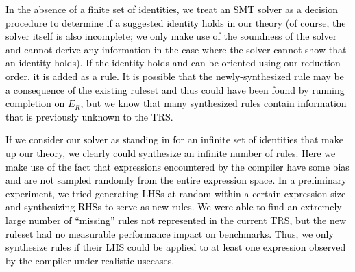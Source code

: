 \documentclass[acmsmall,review]{acmart}\settopmatter{printfolios=true,printccs=false,printacmref=false}
\newcommand{\modified}[1]{\textcolor{black}{{#1}}}
\begin{document}

\modified{%
In the absence of a finite set of identities, we
treat an SMT solver as a decision procedure to determine if a suggested identity 
holds in our theory (of course, the solver itself is also incomplete; we only make use of the 
soundness of the solver and cannot derive any information in the case where the solver cannot
show that an identity holds). If the identity holds and can be oriented using our reduction order, 
it is added as a rule. It is possible that the newly-synthesized rule may be a consequence 
of the existing ruleset and thus could have been found by running completion on $E_R$, 
but we know that many synthesized rules contain information that is previously 
unknown to the TRS.}

\modified{If we consider our solver as standing in for an infinite set of identities that make up
our theory, we clearly could synthesize an infinite number of rules. Here we make use
of the fact that expressions encountered by the compiler have some bias 
and are not sampled randomly from the entire expression space. In a preliminary 
experiment, we tried generating LHSs at random within a certain expression size and 
synthesizing RHSs to serve as new rules. We were able to find an extremely large number of 
``missing'' rules not represented in the current TRS, but the new ruleset had 
no measurable performance impact on benchmarks. Thus, we only synthesize rules if their LHS could be 
applied to at least one expression observed by the compiler under realistic usecases. %
}
\end{document}
